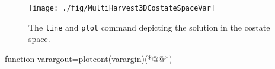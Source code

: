 \begin{figure}
\centering
\texttt{[image: ./fig/MultiHarvest3DCostateSpaceVar]}
\caption{The \lstinline+line+ and \lstinline+plot+ command depicting the solution in the costate space.}
\label{fig:multipleharvest3Dcss}
\end{figure}
\begin{matlab}
function varargout=plotcont(varargin)(*@@*)
%
%
%
% 
%
%
%
%
\end{matlab}
